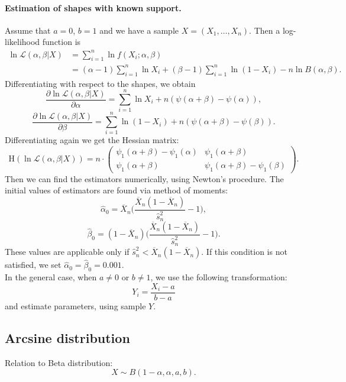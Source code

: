 \documentclass[a4paper,11pt]{article}
\theoremstyle{plain}
\theoremstyle{definition}
\begin{document}
	\paragraph{Estimation of shapes with known support.} Assume that $a=0$, $b=1$ and we have a sample $X = (X_1, \dots, X_n)$. Then a log-likelihood function is
	\begin{equation} \label{Beta log-likelihood}
	\begin{aligned}
	\ln \mathcal{L} (\alpha, \beta | X) &= \sum_{i=1}^{n} \ln f(X_i; \alpha, \beta) \\
	& = (\alpha - 1) \sum_{i=1}^{n} \ln X_i + (\beta - 1) \sum_{i=1}^{n}\ln (1-X_i) - n \ln B(\alpha, \beta).
	\end{aligned}  
	\end{equation}
	Differentiating with respect to the shapes, we obtain
	\[
	\frac{\partial \ln \mathcal{L}(\alpha, \beta | X)}{\partial \alpha} = \sum_{i=1}^{n} \ln X_i + n(\psi(\alpha + \beta) - \psi(\alpha)),
	 \]
	\[
	\frac{\partial \ln \mathcal{L}(\alpha, \beta | X)}{\partial \beta} = \sum_{i=1}^{n} \ln (1-X_i) + n(\psi(\alpha + \beta) - \psi(\beta)).
	\]
	Differentiating again we get the Hessian matrix:
	\[
	\mathrm{H}(\ln\mathcal{L}(\alpha,\beta|X)) = n \cdot \begin{pmatrix}
	\psi_1(\alpha+\beta)-\psi_1(\alpha) & \psi_1(\alpha+\beta) \\
	\psi_1(\alpha+\beta) & \psi_1(\alpha+\beta)-\psi_1(\beta)
	\end{pmatrix}.
	\]
	Then we can find the estimators numerically, using Newton's procedure. The initial values of estimators are found via method of moments:
	\[
	\hat{\alpha}_0 = \overline{X}_n \Bigg( \frac{\overline{X}_n(1-\overline{X}_n)}{\hat{s}_n^2} - 1 \Bigg),
	\]
	\[
	\hat{\beta}_0 = (1-\overline{X}_n) \Bigg( \frac{\overline{X}_n(1-\overline{X}_n)}{\hat{s}_n^2} - 1 \Bigg).
	\]
	These values are applicable only if $\hat{s}_n^2 < \overline{X}_n(1-\overline{X}_n)$. If this condition is not satisfied, we set $\hat{\alpha}_0 = \hat{\beta}_0 = 0.001$.\\
	In the general case, when $a \neq 0$ or $b \neq 1$, we use the following transformation:
	\[ Y_i = \frac{X_i - a}{b - a} \]
	and estimate parameters, using sample $Y$.
	
	\subsection{Arcsine distribution}
	Relation to Beta distribution: \[ X \sim B(1-\alpha, \alpha, a, b). \]
\end{document}
